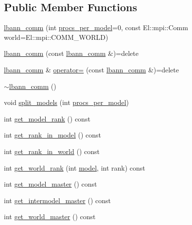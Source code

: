 \subsection*{Public Member Functions}
\begin{DoxyCompactItemize}
\item 
\hyperlink{classlbann_1_1lbann__comm_a63eae73674cbadea2eff8b6595322336}{lbann\+\_\+comm} (int \hyperlink{classlbann_1_1lbann__comm_a7cb55d127259d7ed9f07ccde6f4ebd8c}{procs\+\_\+per\+\_\+model}=0, const El\+::mpi\+::\+Comm world=El\+::mpi\+::\+C\+O\+M\+M\+\_\+\+W\+O\+R\+LD)
\item 
\hyperlink{classlbann_1_1lbann__comm_a198a6066e7908941898e07ebd62f8d18}{lbann\+\_\+comm} (const \hyperlink{classlbann_1_1lbann__comm}{lbann\+\_\+comm} \&)=delete
\item 
\hyperlink{classlbann_1_1lbann__comm}{lbann\+\_\+comm} \& \hyperlink{classlbann_1_1lbann__comm_ae5373895ee134866be9f2b042a1cef21}{operator=} (const \hyperlink{classlbann_1_1lbann__comm}{lbann\+\_\+comm} \&)=delete
\item 
\hyperlink{classlbann_1_1lbann__comm_af17b1093313c5e4223f9036798f9e12f}{$\sim$lbann\+\_\+comm} ()
\item 
void \hyperlink{classlbann_1_1lbann__comm_a0ae02c4083623d2e1381336a73fdb379}{split\+\_\+models} (int \hyperlink{classlbann_1_1lbann__comm_a7cb55d127259d7ed9f07ccde6f4ebd8c}{procs\+\_\+per\+\_\+model})
\item 
int \hyperlink{classlbann_1_1lbann__comm_a6422f70c92bed0b78179facc52b066f7}{get\+\_\+model\+\_\+rank} () const
\item 
int \hyperlink{classlbann_1_1lbann__comm_a789453454468a3b70de768537c50ca52}{get\+\_\+rank\+\_\+in\+\_\+model} () const
\item 
int \hyperlink{classlbann_1_1lbann__comm_a4519335d6772dab3c36517618260d48a}{get\+\_\+rank\+\_\+in\+\_\+world} () const
\item 
int \hyperlink{classlbann_1_1lbann__comm_ab3b1ebe8b72575094405eb2e37bb447d}{get\+\_\+world\+\_\+rank} (int \hyperlink{classlbann_1_1model}{model}, int rank) const
\item 
int \hyperlink{classlbann_1_1lbann__comm_a96d8d7a0ff8ee1511f8c8b8fa92628af}{get\+\_\+model\+\_\+master} () const
\item 
int \hyperlink{classlbann_1_1lbann__comm_adbd99fe6c8df2689217c9ee16d6234d7}{get\+\_\+intermodel\+\_\+master} () const
\item 
int \hyperlink{classlbann_1_1lbann__comm_aa682313f366e0b7cf781bc1872911f65}{get\+\_\+world\+\_\+master} () const

\end{DoxyCompactItemize}
